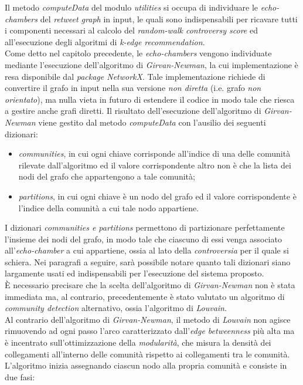 Il metodo \textit{computeData} del modulo \textit{utilities} si occupa di individuare le \textit{echo-chambers} del \textit{retweet graph} in input, le quali sono indispensabili per ricavare tutti i componenti necessari al calcolo del \textit{random-walk controversy score} ed all'esecuzione degli algoritmi di \textit{k-edge recommendation}.
\\Come detto nel capitolo precedente, le \textit{echo-chambers} vengono individuate mediante l'esecuzione dell'algoritmo di \textit{Girvan-Newman}, la cui implementazione è resa disponibile dal \textit{package NetworkX}. Tale implementazione richiede di convertire il grafo in input nella sua versione \textit{non diretta} (i.e. grafo \textit{non orientato}), ma nulla vieta in futuro di estendere il codice in modo tale che riesca a gestire anche grafi diretti. 
Il risultato dell'esecuzione dell'algoritmo di \textit{Girvan-Newman} viene gestito dal metodo \textit{computeData} con l'ausilio dei seguenti dizionari:
\begin{itemize}
\item \textit{communities}, in cui ogni chiave corrisponde all'indice di una delle comunità rilevate dall'algoritmo ed il valore corrispondente altro non è che la lista dei nodi del grafo che appartengono a tale comunità; 
\item \textit{partitions}, in cui ogni chiave è un nodo del grafo ed il valore corrispondente è l'indice della comunità a cui tale nodo appartiene.
\end{itemize}
I dizionari \textit{communities e partitions} permettono di partizionare perfettamente l'insieme dei nodi del grafo, in modo tale che ciascuno di essi venga associato all'\textit{echo-chamber} a cui appartiene, ossia al lato della \textit{controversia} per il quale si schiera. Nei paragrafi a seguire, sarà possibile notare quanto tali dizionari siano largamente usati ed indispensabili per l'esecuzione del sistema proposto.
\\\`E necessario precisare che la scelta dell'algoritmo di \textit{Girvan-Newman} non è stata immediata ma, al contrario, precedentemente è stato valutato un algoritmo di \textit{community detection} alternativo, ossia l'algoritmo di \textit{Louvain}.  
\\Al contrario dell'algoritmo di \textit{Girvan-Newman}, il metodo di \textit{Louvain} non agisce rimuovendo ad ogni passo l'arco caratterizzato dall'\textit{edge betweenness} più alta ma è incentrato sull'ottimizzazione della \textit{modularità}, che misura la densità dei collegamenti all'interno delle comunità rispetto ai collegamenti tra le comunità. L'algoritmo inizia assegnando ciascun nodo alla propria comunità e consiste in due fasi:
